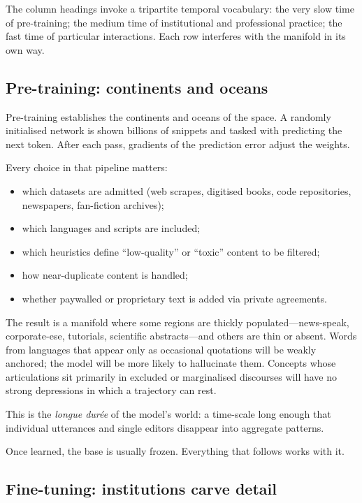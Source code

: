 \documentclass[12pt,a4paper]{article}
\begin{document}
The column headings invoke a tripartite temporal vocabulary: the very slow time of pre-training; the medium time of institutional and professional practice; the fast time of particular interactions. Each row interferes with the manifold in its own way.

\subsection*{Pre-training: continents and oceans}

Pre-training establishes the continents and oceans of the space. A randomly initialised network is shown billions of snippets and tasked with predicting the next token. After each pass, gradients of the prediction error adjust the weights.

Every choice in that pipeline matters:

\begin{itemize}
  \item which datasets are admitted (web scrapes, digitised books, code repositories, newspapers, fan-fiction archives);
  \item which languages and scripts are included;
  \item which heuristics define ``low-quality'' or ``toxic'' content to be filtered;
  \item how near-duplicate content is handled;
  \item whether paywalled or proprietary text is added via private agreements.
\end{itemize}

The result is a manifold where some regions are thickly populated---news-speak, corporate-ese, tutorials, scientific abstracts---and others are thin or absent. Words from languages that appear only as occasional quotations will be weakly anchored; the model will be more likely to hallucinate them. Concepts whose articulations sit primarily in excluded or marginalised discourses will have no strong depressions in which a trajectory can rest.

This is the \emph{longue dur\'{e}e} of the model's world: a time-scale long enough that individual utterances and single editors disappear into aggregate patterns.

Once learned, the base is usually frozen. Everything that follows works with it.

\subsection*{Fine-tuning: institutions carve detail}
\end{document}
